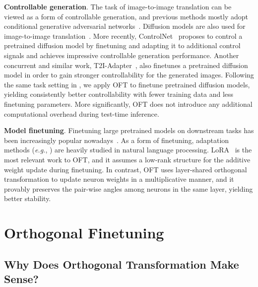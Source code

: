 \documentclass{article}
\newcommand{\eg}{\emph{e.g.}}
\begin{document}
\textbf{Controllable generation}. The task of image-to-image translation can be viewed as a form of controllable generation, and previous methods mostly adopt conditional generative adversarial networks~\cite{isola2017image,zhu2017toward,wang2018high,park2019semantic,choi2018stargan}. Diffusion models are also used for image-to-image translation~\cite{saharia2022palette,voynov2022sketch,wang2022pretraining}. More recently, ControlNet~\cite{zhang2023adding} proposes to control a pretrained diffusion model by finetuning and adapting it to additional control signals and achieves impressive controllable generation performance. Another concurrent and similar work, T2I-Adapter~\cite{mou2023t2i}, also finetunes a pretrained diffusion model in order to gain stronger controllability for the generated images. Following the same task setting in \cite{zhang2023adding,mou2023t2i}, we apply OFT to finetune pretrained diffusion models, yielding consistently better controllability with fewer training data and less finetuning parameters. More significantly, OFT does not introduce any additional computational overhead during test-time inference.



\textbf{Model finetuning}. Finetuning large pretrained models on downstream tasks has been increasingly %
popular nowadays~\cite{devlin2018bert,brown2020language,he2022masked}. As a form of finetuning, adaptation methods (\eg, \cite{hulora2022,houlsby2019parameter,pfeiffer2020adapterfusion}) are heavily studied in natural language processing. LoRA~\cite{hulora2022} is the most relevant work to OFT, and it assumes a low-rank structure for the additive weight update during finetuning. In contrast, OFT uses layer-shared orthogonal transformation to update neuron weights in a multiplicative manner, and it provably preserves the pair-wise angles among neurons in the same layer, yielding better stability.

\vspace{-1.6mm}
\section{Orthogonal Finetuning}
\vspace{-1.15mm}

\subsection{Why Does Orthogonal Transformation Make Sense?}
\vspace{-.9mm}
\end{document}
